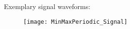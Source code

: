 Exemplary signal waveforms:
\begin{figure}[H]
	\texttt{[image: MinMaxPeriodic\_Signal]}
\end{figure}